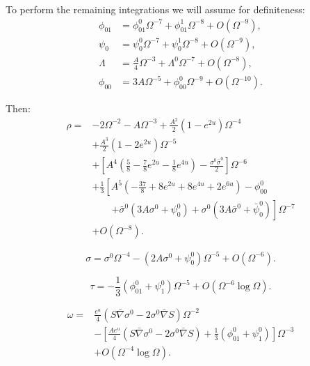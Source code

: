 To perform the remaining integrations we will assume
for definiteness:
\begin{equation}
\begin{aligned}
\phi_{01}
&=
\phi_{01}^{0}\Omega^{-7}
+
\phi_{01}^{1}\Omega^{-8}
+
O(\Omega^{-9}),
\\
\psi_0
&=
\psi_0^{0}\Omega^{-7}
+
\psi_0^{1}\Omega^{-8}
+
O(\Omega^{-9}),
\\
\Lambda
&=
\frac{A}{4}\Omega^{-3}
+
\Lambda^{0}\Omega^{-7}
+
O(\Omega^{-8}),
\\
\phi_{00}
&=
3A\Omega^{-5}
+
\phi_{00}^{0}\Omega^{-9}
+
O(\Omega^{-10}).
\end{aligned}
\tag{7.22}
\end{equation}

Then:
\begin{equation}
\begin{aligned}
\rho
={}&
-2\Omega^{-2}
-A\Omega^{-3}
+\frac{A^2}{2}\left(1-e^{2u}\right)\Omega^{-4}
\\
&+
\frac{A^3}{2}
\left(1-2e^{2u}\right)\Omega^{-5}
\\
&+
\left[
A^4
\left(
\frac{5}{8}
-\frac{7}{8}e^{2u}
-\frac{1}{8}e^{4u}
\right)
-\frac{\sigma^0\bar{\sigma}^0}{2}
\right]\Omega^{-6}
\\
&+
\frac{1}{3}
\left[
A^5
\left(
-\frac{37}{8}
+8e^{2u}
+8e^{4u}
+2e^{6u}
\right)
-\phi_{00}^{0}
\right.
\\
&\qquad\left.
+\bar{\sigma}^{0}
\left(
3A\sigma^{0}
+\psi_0^{0}
\right)
+
\sigma^{0}
\left(
3A\bar{\sigma}^{0}
+\bar{\psi}_0^{0}
\right)
\right]\Omega^{-7}
\\
&+
O(\Omega^{-8}).
\end{aligned}
\tag{7.23}
\end{equation}

\begin{equation}
\sigma
=
\sigma^{0}\Omega^{-4}
-
\left(
2A\sigma^{0}
+
\psi_0^{0}
\right)\Omega^{-5}
+
O(\Omega^{-6}).
\tag{7.24}
\end{equation}

\begin{equation}
\tau
=
-\frac{1}{3}
\left(
\phi_{01}^{0}
+
\psi_1^{0}
\right)\Omega^{-5}
+
O(\Omega^{-6}\log\Omega).
\tag{7.26}
\end{equation}

\begin{equation}
\begin{aligned}
\omega
={}&
\frac{e^u}{4}
\left(
S\bar{\nabla}\sigma^0
-
2\sigma^0\bar{\nabla}S
\right)\Omega^{-2}
\\
&-
\left[
\frac{Ae^u}{4}
\left(
S\bar{\nabla}\sigma^0
-
2\sigma^0\bar{\nabla}S
\right)
+
\frac{1}{3}
\left(
\phi_{01}^0+\psi_1^0
\right)
\right]\Omega^{-3}
\\
&+
O(\Omega^{-4}\log\Omega).
\end{aligned}
\tag{7.26}
\end{equation}

